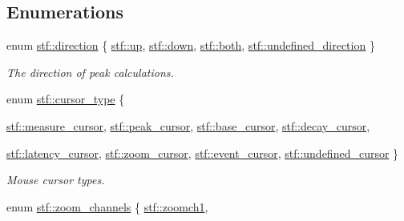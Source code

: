 \subsection*{Enumerations}
\begin{DoxyCompactItemize}
\item 
enum \hyperlink{group__stfgen_gae8845ae2aeaf4b742a905a2a5571fd5a}{stf::direction} \{ \hyperlink{group__stfgen_ggae8845ae2aeaf4b742a905a2a5571fd5aaf12a3d86708046ee92fa400c99fcbecb}{stf::up}, 
\hyperlink{group__stfgen_ggae8845ae2aeaf4b742a905a2a5571fd5aaccaa84903131c15d67e4f95298e68e2b}{stf::down}, 
\hyperlink{group__stfgen_ggae8845ae2aeaf4b742a905a2a5571fd5aa22cccef6520f7679886dc6d584805ce3}{stf::both}, 
\hyperlink{group__stfgen_ggae8845ae2aeaf4b742a905a2a5571fd5aab5df1157da4f45612d5815bc164e0931}{stf::undefined\_\-direction}
 \}
\begin{DoxyCompactList}\small\item\em The direction of peak calculations. \item\end{DoxyCompactList}\item 
enum \hyperlink{group__stfgen_gad2d1acb3ac0c16ee32b5f4d3a1ab4abf}{stf::cursor\_\-type} \{ \par
\hyperlink{group__stfgen_ggad2d1acb3ac0c16ee32b5f4d3a1ab4abfa1b879af00b1b8b8c4a195c0b27de3f0b}{stf::measure\_\-cursor}, 
\hyperlink{group__stfgen_ggad2d1acb3ac0c16ee32b5f4d3a1ab4abfad99eafbc283ce642e9ff607357c95e9b}{stf::peak\_\-cursor}, 
\hyperlink{group__stfgen_ggad2d1acb3ac0c16ee32b5f4d3a1ab4abfa8c54633348bfe4fdeaf6c8ddf06fccba}{stf::base\_\-cursor}, 
\hyperlink{group__stfgen_ggad2d1acb3ac0c16ee32b5f4d3a1ab4abfab09f70483c5bed40addf3c21eb528afe}{stf::decay\_\-cursor}, 
\par
\hyperlink{group__stfgen_ggad2d1acb3ac0c16ee32b5f4d3a1ab4abfabb059a629fb7fbf5d9a3f83c44954b9b}{stf::latency\_\-cursor}, 
\hyperlink{group__stfgen_ggad2d1acb3ac0c16ee32b5f4d3a1ab4abfadb6eff6e3108c48f2dd357dc3b539238}{stf::zoom\_\-cursor}, 
\hyperlink{group__stfgen_ggad2d1acb3ac0c16ee32b5f4d3a1ab4abfa28885ead48beb5a6da1810d391d41760}{stf::event\_\-cursor}, 
\hyperlink{group__stfgen_ggad2d1acb3ac0c16ee32b5f4d3a1ab4abfa2794c8863a730fbd8e4dea7f93b8dfa7}{stf::undefined\_\-cursor}
 \}
\begin{DoxyCompactList}\small\item\em Mouse cursor types. \item\end{DoxyCompactList}\item 
enum \hyperlink{group__stfgen_ga9a792b11c01e9429bfe2acd3e4ef108b}{stf::zoom\_\-channels} \{ \hyperlink{group__stfgen_gga9a792b11c01e9429bfe2acd3e4ef108bafdaacd56a89cce6998f8fcc331b0f665}{stf::zoomch1}, 

\end{DoxyCompactItemize}
